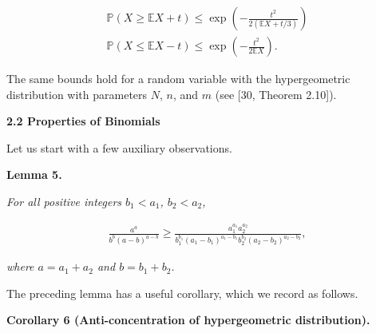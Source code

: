 \[\begin{gathered}
\displaystyle\mathbb{P}(X\geq\mathbb{E}X+t) \displaystyle\leq \displaystyle\exp\left(-\frac{t^{2}}{2(\mathbb{E}X+t/3)}\right) \\
\displaystyle\mathbb{P}(X\leq\mathbb{E}X-t) \displaystyle\leq \displaystyle\exp\left(-\frac{t^{2}}{2\mathbb{E}X}\right).
\end{gathered}\]


The same bounds hold for a random variable with the hypergeometric distribution with parameters $N$, $n$, and $m$ (see [30, Theorem 2.10]).\par





\par\medskip\noindent\textbf{
2.2 Properties of Binomials}\par




Let us start with a few auxiliary observations.\par





\par\medskip\noindent\textbf{
\textbf{Lemma 5}\textbf{.}
}\par



\emph{For all positive integers $b_{1}<a_{1}$, $b_{2}<a_{2}$,}\par


\[\begin{gathered}
\frac{a^{a}}{b^{b}(a-b)^{a-b}}\geq\frac{a_{1}^{a_{1}}a_{2}^{a_{2}}}{b_{1}^{b_{1}}(a_{1}-b_{1})^{a_{1}-b_{1}}b_{2}^{b_{2}}(a_{2}-b_{2})^{a_{2}-b_{2}}},
\end{gathered}\]


\emph{where $a=a_{1}+a_{2}$ and $b=b_{1}+b_{2}$.}\par






The preceding lemma has a useful corollary, which we record as follows.\par





\par\medskip\noindent\textbf{
\textbf{Corollary 6}\textbf{ }(Anti-concentration of hypergeometric distribution)\textbf{.}
}\par




